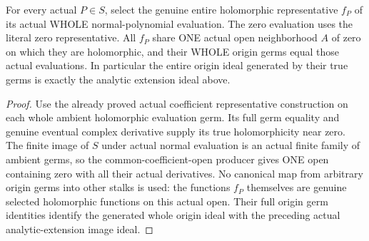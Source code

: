 \begin{theorem}
\label{hir:relative-normal-deformation-finite-evaluation-representatives}
\leanok
{}
For every actual $P\in S$, select the genuine entire holomorphic representative
$f_P$ of its actual WHOLE normal-polynomial evaluation. The zero evaluation
uses the literal zero representative. All $f_P$ share ONE actual open
neighborhood $A$ of zero on which they are holomorphic, and their WHOLE origin
germs equal those actual evaluations. In particular the entire origin ideal
generated by their true germs is exactly the analytic extension ideal above.
\end{theorem}
\begin{proof}
Use the already proved actual coefficient representative construction on each
whole ambient holomorphic evaluation germ. Its full germ equality and genuine
eventual complex derivative supply its true holomorphicity near zero. The
finite image of $S$ under actual normal evaluation is an actual finite family
of ambient germs, so the common-coefficient-open producer gives ONE open
containing zero with all their actual derivatives. No canonical map from
arbitrary origin germs into other stalks is used: the functions $f_P$ themselves
are genuine selected holomorphic functions on this actual open. Their full
origin germ identities identify the generated whole origin ideal with the
preceding actual analytic-extension image ideal.
\end{proof}

